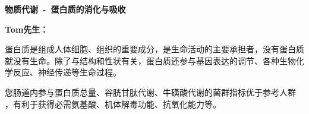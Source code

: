 

\usepackage{graphicx}
\graphicspath{{cores/}}



\setlength{\arrayrulewidth}{0.5pt}
\fontsize{9.3pt}{17pt}\selectfont
\color{gray2}

\vspace*{0mm}
\begin{center}
{\bf\sanhao 物质代谢~-~蛋白质的消化与吸收}
\end{center}


\medskip
\noindent
{\bf\xiaosihao Tom先生：}

\bigskip

蛋白质是组成人体细胞、组织的重要成分，是生命活动的主要承担者，没有蛋白质就没有生命。除了与结构和性状有关，蛋白质还参与基因表达的调节、各种生物化学反应、神经传递等生命过程。

您肠道内参与蛋白质总量、谷胱甘肽代谢、牛磺酸代谢的菌群指标优于参考人群
，有利于获得必需氨基酸、机体解毒功能、抗氧化能力等。

